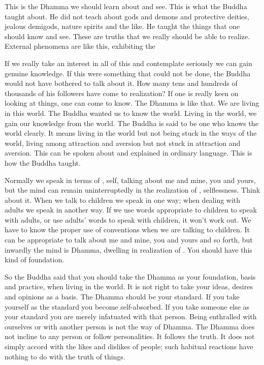 This is the Dhamma we should learn about and see. This is what the Buddha taught about. He did not teach about gods and demons and  protective deities, jealous demigods, nature spirits and the like. He taught the things that one should know and see. These are truths that we really should be able to realize. External phenomena are like this, exhibiting the 

If we really take an interest in all of this and contemplate seriously we can gain genuine knowledge. If this were something that could not be done, the Buddha would not have bothered to talk about it. How many tens and hundreds of thousands of his followers have come to realization? If one is really keen on looking at things, one can come to know. The Dhamma is like that. We are living in this world. The Buddha wanted us to know the world. Living in the world, we gain our knowledge from the world. The Buddha is said to be  one who knows the world clearly. It means living in the world but not being stuck in the ways of the world, living among attraction and aversion but not stuck in attraction and aversion. This can be spoken about and explained in ordinary language. This is how the Buddha taught.

Normally we speak in terms of , self, talking about me and mine, you and yours, but the mind can remain uninterruptedly in the realization of , selflessness. Think about it. When we talk to children we speak in one way; when dealing with adults we speak in another way. If we use words appropriate to children to speak with adults, or use adults' words to speak with children, it won't work out. We have to know the proper use of conventions when we are talking to children. It can be appropriate to talk about me and mine, you and yours and so forth, but inwardly the mind is Dhamma, dwelling in realization of . You should have this kind of foundation.

So the Buddha said that you should take the Dhamma as your foundation, basis and practice, when living in the world. It is not right to take your ideas, desires and opinions as a basis. The Dhamma should be your standard. If you take yourself as the standard you become self-absorbed. If you take someone else as your standard you are merely infatuated with that person. Being enthralled with ourselves or with another person is not the way of Dhamma. The Dhamma does not incline to any person or follow personalities. It follows the truth. It does not simply accord with the likes and dislikes of people; such habitual reactions have nothing to do with the truth of things.


